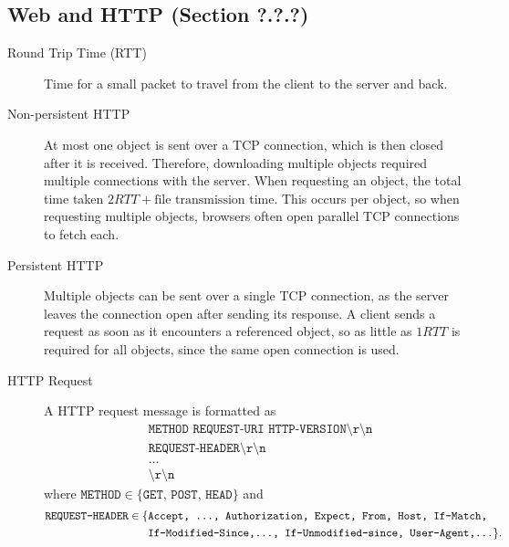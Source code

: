 \documentclass{article}
\begin{document}
\subsection*{Web and HTTP (Section ?.?.?)}

\begin{description}
    \item[Round Trip Time (RTT)] Time for a small packet to travel from the client to the server and
    back.
    
    \item[Non-persistent HTTP] At most one object is sent over a TCP connection, which is then closed
    after it is received. Therefore, downloading multiple objects required multiple connections with 
    the server. When requesting an object, the total time taken $2RTT+\text{file transmission time}$.
    This occurs per object, so when requesting multiple objects, browsers often open parallel TCP
    connections to fetch each.
    
    \item[Persistent HTTP] Multiple objects can be sent over a single TCP connection, as the server
    leaves the connection open after sending its response. A client sends a request as soon as it 
    encounters a referenced object, so as little as $1RTT$ is required for all objects, since the 
    same open connection is used.
    
    \item[HTTP Request]
    A HTTP request message is formatted as
    \begin{align*}
        &\texttt{METHOD REQUEST-URI HTTP-VERSION\textbackslash r\textbackslash n}\\
        &\texttt{REQUEST-HEADER\textbackslash r\textbackslash n}\\
        &\dots\\
        &\texttt{\textbackslash r\textbackslash n}
    \end{align*}
    where $\texttt{METHOD}\in\{\texttt{GET, POST, HEAD}\}$ and
    \begin{align*}
        \texttt{REQUEST-HEADER}\in\{&\texttt{Accept, \dots, Authorization, Expect, From, Host, If-Match,}\\
        &\texttt{If-Modified-Since,\dots, If-Unmodified-since, User-Agent,\dots}\}.
    \end{align*}
    

\end{description}
\end{document}
